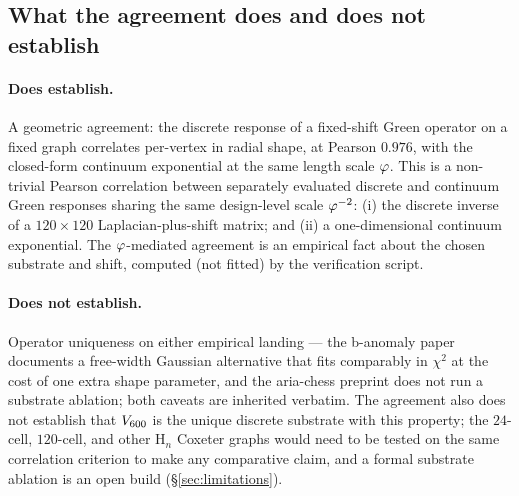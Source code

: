 \subsection{What the agreement does and does not establish}

\paragraph{Does establish.} A geometric agreement: the discrete
response of a fixed-shift Green operator on a fixed graph
correlates per-vertex in radial shape, at Pearson $0.976$, with
the closed-form continuum exponential at the same length scale
$\varphi$. This is a non-trivial Pearson correlation between
separately evaluated discrete and continuum Green responses
sharing the same design-level scale $\varphi^{-2}$: (i) the discrete
inverse of a $120\times 120$ Laplacian-plus-shift matrix; and
(ii) a one-dimensional continuum exponential. The $\varphi$-mediated
agreement is an empirical fact about the chosen substrate and
shift, computed (not fitted) by the verification script.

\paragraph{Does not establish.} Operator uniqueness on either
empirical landing — the b-anomaly paper documents a free-width
Gaussian alternative that fits comparably in $\chi^{2}$ at the
cost of one extra shape parameter, and the aria-chess preprint
does not run a substrate ablation; both caveats are inherited
verbatim. The agreement also does not establish that
$V_{600}$ is the unique discrete substrate with this
property; the $24$-cell, $120$-cell, and other H$_n$ Coxeter
graphs would need to be tested on the same correlation criterion
to make any comparative claim, and a formal substrate ablation is
an open build (\S\ref{sec:limitations}).
